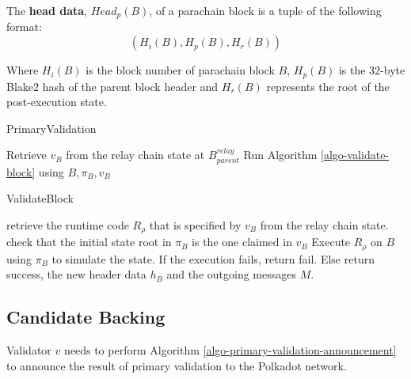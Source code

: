 \begin{definition}
  \label{defn-head-data}
  The \textbf{head data}, $Head_p(B)$, of a parachain block is a tuple of the following format:
  \[
    (H_i(B), H_p(B), H_r(B))
  \]

  Where $H_i(B)$ is the block number of parachain block $B$, $H_p(B)$ is the
  32-byte Blake2 hash of the parent block header and $H_r(B)$ represents the
  root of the post-execution state.
\end{definition}

\begin{algorithm}[H]
  \caption[]{\sc PrimaryValidation}
  \label{algo-primary-validation}
  \begin{algorithmic}[1]

    \State Retrieve $v_B$ from the relay chain state at $B^{relay}_{parent}$
    \State Run Algorithm \ref{algo-validate-block} using $B, \pi_B, v_B$
  \end{algorithmic}
\end{algorithm}

\begin{algorithm}[H]
  \caption[]{\sc ValidateBlock}
  \label{algo-validate-block}
  \begin{algorithmic}[1]
    \State retrieve the runtime code $R_\rho$ that is specified by $v_B$ from the relay chain state.
    \State check that the initial state root in $\pi_B$ is the one claimed in $v_B$
    \State Execute $R_\rho$ on $B$ using $\pi_B$ to simulate the state.
    \State If the execution fails, return fail.
    \State Else return success, the new header data $h_B$ and the outgoing messages $M$. 
  \end{algorithmic}
\end{algorithm}

\subsection{Candidate Backing}

\label{sect-primary-validaty-announcement}
Validator $v$ needs to perform Algorithm \ref{algo-primary-validation-announcement} to announce the result of primary validation to the Polkadot network.
\newline

